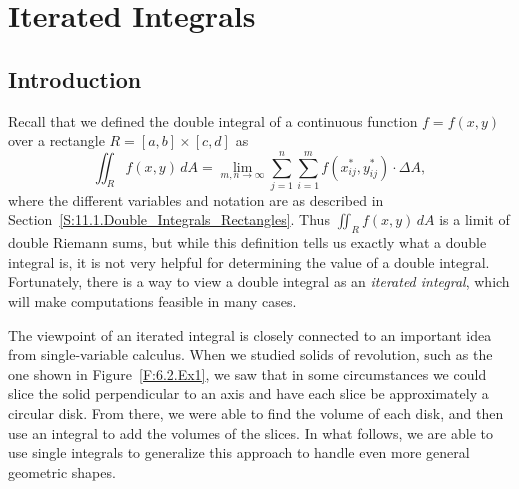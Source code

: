 \section{Iterated Integrals} \label{S:11.2.Iterated_Integrals}

\vspace*{-14 pt}



\subsection*{Introduction}

Recall that we defined the double integral of a continuous function $f = f(x,y)$ over a rectangle $R = [a,b] \times [c,d]$ as
\[\iint_R f(x,y) \, dA = \lim_{m,n \to \infty} \sum_{j=1}^n \sum_{i=1}^m f\left(x_{ij}^*, y_{ij}^*\right) \cdot \Delta A,\]
where the different variables and notation are as described in Section~\ref{S:11.1.Double_Integrals_Rectangles}.  Thus $\iint_R f(x,y) \, dA$ is a limit of double Riemann sums, but while this definition tells us exactly what a double integral is, it is not very helpful for determining the value of a double integral. Fortunately, there is a way to view a double integral as an \emph{iterated integral}, which will make computations feasible in many cases.

The viewpoint of an iterated integral is closely connected to an important idea from single-variable calculus.  When we studied solids of revolution, such as the one shown in Figure~\ref{F:6.2.Ex1}, we saw that in some circumstances we could slice the solid perpendicular to an axis and have each slice be approximately a circular disk.  From there, we were able to find the volume of each disk, and then use an integral to add the volumes of the slices.  In what follows, we are able to use single integrals to generalize this approach to handle even more general geometric shapes.

